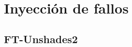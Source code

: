 \chapter{Inyección de fallos}
\label{ch:InyeccionDeFallos}

\lettrine[lraise=-0.1, lines=2, loversize=0.2]{}{}

\section{FT-Unshades2}
\label{sec:FT-Unshades2}

\endinput
